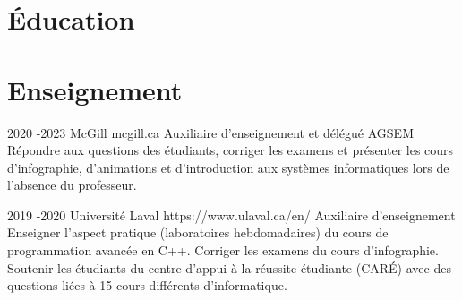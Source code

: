 \documentclass[10pt]{article} %
\begin{document}

\section{Éducation}







\section{Enseignement}


\job
{2020 -}{2023}
{McGill}
{mcgill.ca}
{Auxiliaire d'enseignement et délégué AGSEM}
{Répondre aux questions des étudiants, corriger les examens et présenter les cours d'infographie,
d'animations et d'introduction aux systèmes informatiques lors de l'absence du professeur.}

\job
{2019 -}{2020}
{Université Laval}
{https://www.ulaval.ca/en/}
{Auxiliaire d'enseignement}
{Enseigner l'aspect pratique (laboratoires hebdomadaires) du cours de programmation avancée en C++. Corriger les examens du cours d'infographie. Soutenir les étudiants du centre d'appui à la réussite étudiante (CARÉ) avec des questions liées à 15 cours différents d'informatique.}
\end{document}
